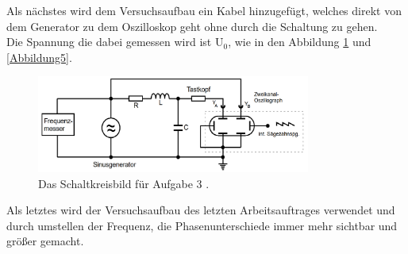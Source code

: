 \begin{flushleft}
    Als nächstes wird dem Versuchsaufbau ein Kabel hinzugefügt, welches 
    direkt von dem Generator zu dem Oszilloskop geht ohne durch die Schaltung zu gehen. \\
    Die Spannung die dabei gemessen wird ist $\text{U}_{0}$, wie in den Abbildung \ref{Abbildung9} und \ref{Abbildung5}.
\end{flushleft}


\begin{figure}[H]
    \centering
    \includegraphics[width=90mm]{bilder/Ab9.png}
    \caption{Das Schaltkreisbild für Aufgabe 3 \cite[13]{GedUErzSch}. \label{Abbildung9}}
\end{figure}


\begin{flushleft}
    Als letztes wird der Versuchsaufbau des letzten Arbeitsauftrages verwendet und durch umstellen der Frequenz, die Phasenunterschiede 
    immer mehr sichtbar und größer gemacht.
\end{flushleft}
